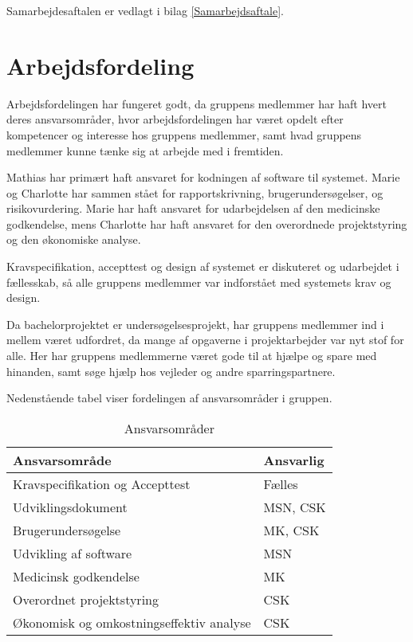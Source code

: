 Samarbejdesaftalen er vedlagt i bilag \ref{Samarbejdsaftale}. 

\section{Arbejdsfordeling}
Arbejdsfordelingen har fungeret godt, da gruppens medlemmer har haft hvert deres ansvarsområder, hvor arbejdsfordelingen har været opdelt efter kompetencer og interesse hos gruppens medlemmer, samt hvad gruppens medlemmer kunne tænke sig at arbejde med i fremtiden.  

Mathias har primært haft ansvaret for kodningen af software til systemet. Marie og Charlotte har sammen stået for rapportskrivning, brugerundersøgelser, og risikovurdering. Marie har haft ansvaret for udarbejdelsen af den medicinske godkendelse, mens Charlotte har haft ansvaret for den overordnede projektstyring og den økonomiske analyse. 

Kravspecifikation, accepttest og design af systemet er diskuteret og udarbejdet i fællesskab, så alle gruppens medlemmer var indforstået med systemets krav og design. 

Da bachelorprojektet er undersøgelsesprojekt, har gruppens medlemmer ind i mellem været udfordret, da mange af opgaverne i projektarbejder var nyt stof for alle. Her har gruppens medlemmerne været gode til at hjælpe og spare med hinanden, samt søge hjælp hos vejleder og andre sparringspartnere.  

Nedenstående tabel viser fordelingen af ansvarsområder i gruppen. 

\begin{table}[h]
\centering
\begin{tabular}{|l| p{}|}
\hline
\textbf{Ansvarsområde} &  \textbf{Ansvarlig} \\\hline
Kravspecifikation og Accepttest & Fælles \\\hline
Udviklingsdokument & MSN, CSK\\\hline
Brugerundersøgelse & MK, CSK \\\hline
Udvikling af software & MSN\\\hline
Medicinsk godkendelse & MK \\\hline
Overordnet projektstyring & CSK \\\hline
Økonomisk og omkostningseffektiv analyse & CSK \\\hline
\end{tabular}
\caption{Ansvarsområder}
\end{table}

